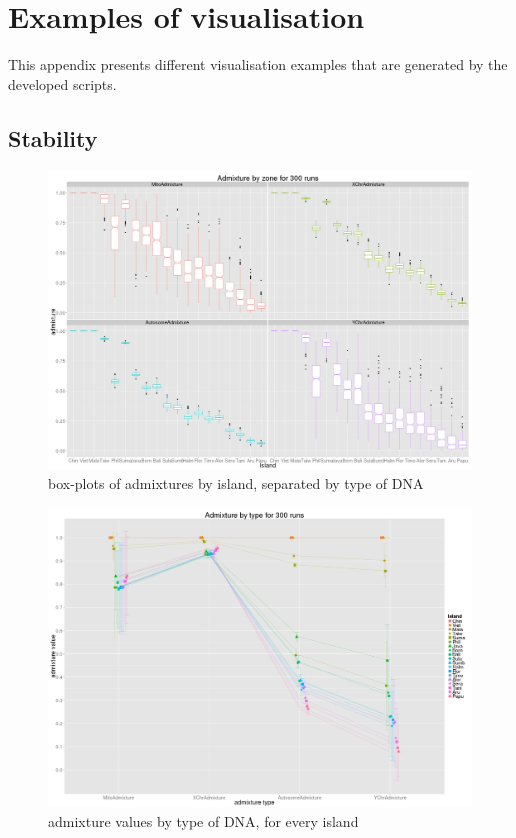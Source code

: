 \documentclass[a4paper,12pt]{report}
\begin{document}



\appendix
\renewcommand{\thesection}{\Roman{section}}
\chapter{Examples of visualisation}
\label{app:ex-visu}

This appendix presents different visualisation examples that are generated by the developed scripts.

\section{Stability}
\begin{figure}[!ht]
	\centering
	\includegraphics[scale=0.22]{../data/stability.png}
	\caption{box-plots of admixtures by island, separated by type of DNA}
	\label{app:stability}
\end{figure}

\begin{figure}[!ht]
	\centering
	\includegraphics[scale=0.22]{../data/stability-admixGradient.png}
	\caption{admixture values by type of DNA, for every island}
	\label{app:stability-admixGradient}
\end{figure}
\end{document}
